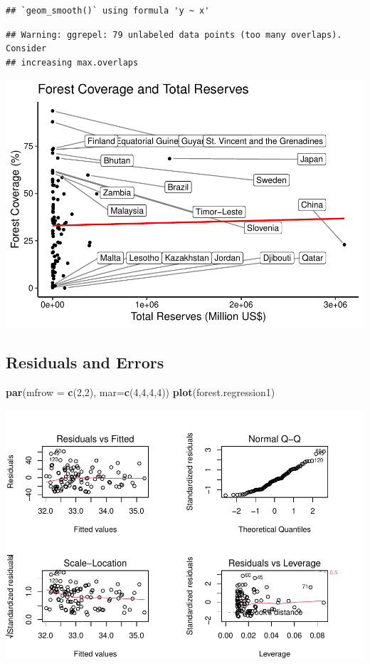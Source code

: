 \documentclass[
  12pt,
]{article}
\newenvironment{Shaded}{\begin{snugshade}}{\end{snugshade}}
\newcommand{\DataTypeTok}[1]{\textcolor[rgb]{0.13,0.29,0.53}{#1}}
\newcommand{\DecValTok}[1]{\textcolor[rgb]{0.00,0.00,0.81}{#1}}
\newcommand{\KeywordTok}[1]{\textcolor[rgb]{0.13,0.29,0.53}{\textbf{#1}}}
\newcommand{\NormalTok}[1]{#1}
\begin{document}
\begin{verbatim}
## `geom_smooth()` using formula 'y ~ x'
\end{verbatim}

\begin{verbatim}
## Warning: ggrepel: 79 unlabeled data points (too many overlaps). Consider
## increasing max.overlaps
\end{verbatim}

\includegraphics{Final_Project_Code_files/figure-latex/unnamed-chunk-3-1.pdf}

\hypertarget{residuals-and-errors}{%
\subsection{Residuals and Errors}\label{residuals-and-errors}}

\begin{Shaded}
\begin{Highlighting}[]
\KeywordTok{par}\NormalTok{(}\DataTypeTok{mfrow =} \KeywordTok{c}\NormalTok{(}\DecValTok{2}\NormalTok{,}\DecValTok{2}\NormalTok{), }\DataTypeTok{mar=}\KeywordTok{c}\NormalTok{(}\DecValTok{4}\NormalTok{,}\DecValTok{4}\NormalTok{,}\DecValTok{4}\NormalTok{,}\DecValTok{4}\NormalTok{))}
\KeywordTok{plot}\NormalTok{(forest.regression1)}
\end{Highlighting}
\end{Shaded}

\includegraphics{Final_Project_Code_files/figure-latex/unnamed-chunk-4-1.pdf}
\end{document}
